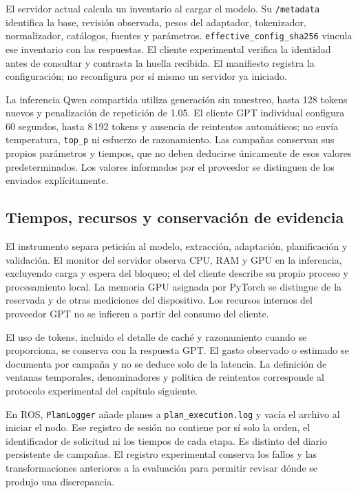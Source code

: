 El servidor actual calcula un inventario al cargar el modelo. Su
\texttt{/metadata} identifica la base, revisión observada, pesos del
adaptador, tokenizador, normalizador, catálogos, fuentes y parámetros.
\texttt{effective\_\allowbreak config\_\allowbreak sha256} vincula ese inventario con las
respuestas. El cliente experimental verifica la identidad antes de
consultar y contrasta la huella recibida. El manifiesto registra la
configuración; no reconfigura por sí mismo un servidor ya iniciado.

La inferencia Qwen compartida utiliza generación sin muestreo, hasta
128 tokens nuevos y penalización de repetición de 1.05. El cliente GPT
individual configura 60 segundos, hasta 8\,192 tokens y ausencia de
reintentos automáticos; no envía temperatura, \texttt{top\_p} ni
esfuerzo de razonamiento. Las campañas conservan sus propios parámetros
y tiempos, que no deben deducirse únicamente de esos valores
predeterminados. Los valores informados por el proveedor se distinguen
de los enviados explícitamente.

\subsection{Tiempos, recursos y conservación de evidencia}

El instrumento separa petición al modelo, extracción, adaptación,
planificación y validación. El monitor del servidor observa CPU, RAM y
GPU en la inferencia, excluyendo carga y espera del bloqueo; el del
cliente describe su propio proceso y procesamiento local. La memoria
GPU asignada por PyTorch se distingue de la reservada y de otras
mediciones del dispositivo. Los recursos internos del proveedor GPT no
se infieren a partir del consumo del cliente.

El uso de tokens, incluido el detalle de caché y razonamiento cuando se
proporciona, se conserva con la respuesta GPT. El gasto observado o
estimado se documenta por campaña y no se deduce solo de la latencia.
La definición de ventanas temporales, denominadores y política de
reintentos corresponde al protocolo experimental del capítulo siguiente.

En ROS, \texttt{PlanLogger} añade planes a \texttt{plan\_\allowbreak execution.\allowbreak log}
y vacía el archivo al iniciar el nodo. Ese registro de sesión no contiene
por sí solo la orden, el identificador de solicitud ni los tiempos de
cada etapa. Es distinto del diario persistente de campañas. El registro
experimental conserva los fallos y las transformaciones anteriores a
la evaluación para permitir revisar dónde se produjo una discrepancia.

